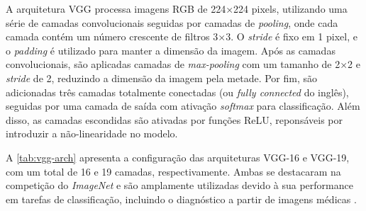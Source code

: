 A arquitetura VGG processa imagens RGB de 224×224 pixels, utilizando uma série de camadas convolucionais seguidas por camadas de \textit{pooling}, onde cada camada contém um número crescente de filtros 3×3. O \textit{stride} é fixo em 1 pixel, e o \textit{padding} é utilizado para manter a dimensão da imagem. Após as camadas convolucionais, são aplicadas camadas de \textit{max-pooling} com um tamanho de 2×2 e \textit{stride} de 2, reduzindo a dimensão da imagem pela metade. Por fim, são adicionadas três camadas totalmente conectadas (ou \textit{fully connected} do inglês), seguidas por uma camada de saída com ativação \textit{softmax} para classificação. Além disso, as camadas escondidas são ativadas por funções ReLU, reponsáveis por introduzir a não-linearidade no modelo.

A \autoref{tab:vgg-arch} apresenta a configuração das arquiteturas VGG-16 e VGG-19, com um total de 16 e 19 camadas, respectivamente. Ambas se destacaram na competição do \textit{ImageNet} e são amplamente utilizadas devido à sua performance em tarefas de classificação, incluindo o diagnóstico a partir de imagens médicas \citep{Saini2023, Sitaula2021}.

